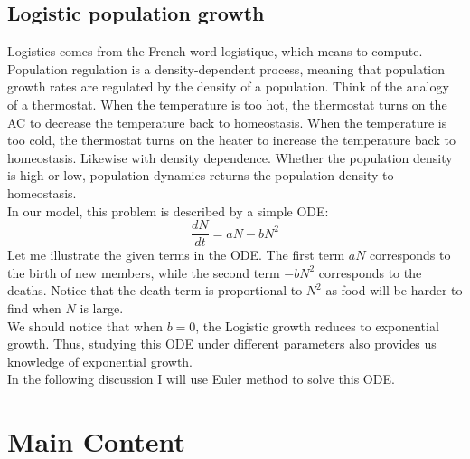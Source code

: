 \documentclass[10pt,a4paper]{article}
\begin{document}
	\subsection{Logistic population growth}
	Logistics comes from the French word logistique, which means to compute. Population regulation is a density-dependent process, meaning that population growth rates are regulated by the density of a population. Think of the analogy of a thermostat. When the temperature is too hot, the thermostat turns on the AC to decrease the temperature back to homeostasis. When the temperature is too cold, the thermostat turns on the heater to increase the temperature back to homeostasis. Likewise with density dependence. Whether the population density is high or low, population dynamics returns the population density to homeostasis.\\
	In our model, this problem is described by a simple ODE:
	\begin{equation}
	\frac{dN}{dt}=aN-bN^2
	\end{equation}    
    Let me illustrate the given terms in the ODE. The first term $aN$ corresponds to the birth of new members, while the second term $-bN^2$ corresponds to the deaths. Notice that the death term is proportional to $N^2$ as food will be harder to find when $N$ is large.\\
    We should notice that when $b=0$, the Logistic growth reduces to exponential growth. Thus, studying this ODE under different parameters also provides us knowledge of exponential growth.\\ 
    In the following discussion I will use Euler method to solve this ODE.
    
    \section{Main Content}
\end{document}
